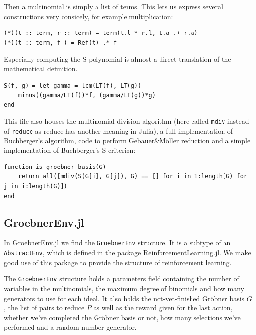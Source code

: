 \documentclass{article}
\theoremstyle{changedot}
\theoremstyle{changedotbreak}
\theoremstyle{nonumberplain}
\begin{document}
Then a multinomial is simply a list of terms. This lets us express several constructions very consicely, for example multiplication:
\begin{verbatim}
(*)(t :: term, r :: term) = term(t.l * r.l, t.a .+ r.a)
(*)(t :: term, f ) = Ref(t) .* f
\end{verbatim}

Especially computing the S-polynomial is almost a direct translation of the mathematical definition.
\begin{verbatim}
S(f, g) = let gamma = lcm(LT(f), LT(g))
    minus((gamma/LT(f))*f, (gamma/LT(g))*g)
end
\end{verbatim}

This file also houses the multinomial division algorithm (here called \texttt{mdiv} instead of \texttt{reduce} as reduce has another meaning in Julia), a full implementation of Buchberger's algorithm, code to perform Gebauer\&Möller reduction and a simple implementation of Buchberger's S-criterion:

\begin{verbatim}
function is_groebner_basis(G)
    return all([mdiv(S(G[i], G[j]), G) == [] for i in 1:length(G) for j in i:length(G)])
end
\end{verbatim}


\subsection{GroebnerEnv.jl}
In GroebnerEnv.jl we find the \texttt{GroebnerEnv} structure. It is a subtype of an \texttt{AbstractEnv}, which is defined in the package ReinforcementLearning.jl. We make good use of this package to provide the structure of reinforcement learning.

The \texttt{GroebnerEnv} structure holds a parameters field containing the number of variables in the multinomials, the maximum degree of binomials and how many generators to use for each ideal. It also holds the not-yet-finished Gröbner basis $G$, the list of pairs to reduce $P$ as well as the reward given for the last action, whether we've completed the Gröbner basis or not, how many selections we've performed and a random number generator.
\end{document}
